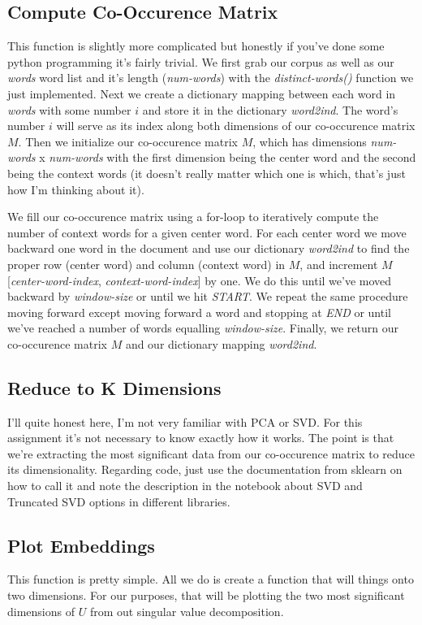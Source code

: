 \documentclass[12pt]{article}
\begin{document}
\subsection{Compute Co-Occurence Matrix}
This function is slightly more complicated but honestly if you've done some python programming it's fairly 
trivial. We first grab our corpus as well as our \emph{words} word list and it's length (\emph{num-words}) 
with the \emph{distinct-words()} function we just implemented. Next we create a dictionary mapping between 
each word in \emph{words} with some number $i$ and store it in the dictionary \emph{word2ind}. The word's 
number $i$ will serve as its index along both dimensions of our co-occurence matrix $M$. Then we 
initialize our co-occurence matrix $M$, which has dimensions \emph{num-words} x \emph{num-words} with the 
first dimension being the center word and the second being the context words (it doesn't really matter which
one is which, that's just how I'm thinking about it).

We fill our co-occurence matrix using a for-loop to iteratively compute the number of context words
for a given center word. For each center word we move backward one word in the document and use our dictionary 
\emph{word2ind} to find the proper row (center word) and column (context word) in $M$, and increment 
$M$[\emph{center-word-index}, \emph{context-word-index}] by one. We do this until we've moved backward 
by \emph{window-size} or until we hit \emph{START}. We repeat the same procedure moving forward
except moving forward a word and stopping at \emph{END} or until we've reached a number of words equalling \emph{window-size}. 
Finally, we return our co-occurence matrix $M$ and our dictionary mapping \emph{word2ind}. 

\subsection{Reduce to K Dimensions}
I'll quite honest here, I'm not very familiar with PCA or SVD. For this assignment it's not necessary 
to know exactly how it works. The point is that we're extracting the most significant data from our 
co-occurence matrix to reduce its dimensionality. Regarding code, just use the documentation from sklearn
on how to call it and note the description in the notebook about SVD and Truncated SVD options in different libraries. 

\subsection{Plot Embeddings}
This function is pretty simple. All we do is create a function that will things
onto two dimensions. For our purposes, that will be plotting the two most significant
dimensions of $U$ from out singular value decomposition. 
\end{document}
